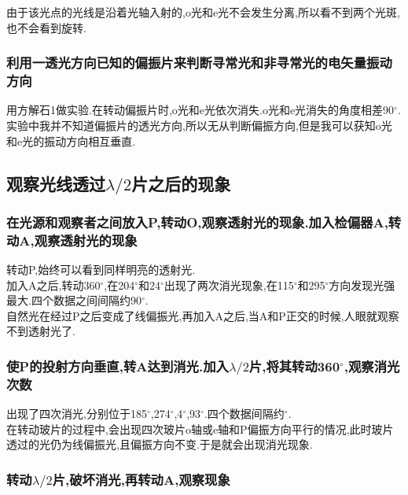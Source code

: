 \documentclass[a4paper,10pt,notitlepage]{article}
\begin{document}
	由于该光点的光线是沿着光轴入射的,o光和e光不会发生分离,所以看不到两个光斑,也不会看到旋转. \\
	
\subsubsection{利用一透光方向已知的偏振片来判断寻常光和非寻常光的电矢量振动方向}

	用方解石1做实验.在转动偏振片时,o光和e光依次消失.o光和e光消失的角度相差90$^{\circ}$. \\
	
	实验中我并不知道偏振片的透光方向,所以无从判断偏振方向,但是我可以获知o光和e光的振动方向相互垂直. \\

\subsection{观察光线透过$\lambda / 2$片之后的现象}

\subsubsection{在光源和观察者之间放入P,转动O,观察透射光的现象.加入检偏器A,转动A,观察透射光的现象}

	转动P,始终可以看到同样明亮的透射光. \\
	
	加入A之后,转动360$^{\circ}$,在204$^{\circ}$和24$^{\circ}$出现了两次消光现象,在115$^{\circ}$和295$^{\circ}$方向发现光强最大.四个数据之间间隔约90$^{\circ}$. \\
	
	自然光在经过P之后变成了线偏振光,再加入A之后,当A和P正交的时候,人眼就观察不到透射光了. \\
	
\subsubsection{使P的投射方向垂直,转A达到消光.加入$\lambda / 2$片,将其转动360$^{\circ}$,观察消光次数}

	出现了四次消光,分别位于185$^{\circ}$,274$^{\circ}$,4$^{\circ}$,93$^{\circ}$.四个数据间隔约$^{\circ}$. \\
	
	在转动玻片的过程中,会出现四次玻片o轴或e轴和P偏振方向平行的情况,此时玻片透过的光仍为线偏振光,且偏振方向不变.于是就会出现消光现象. \\
	
\subsubsection{转动$\lambda / 2$片,破坏消光,再转动A,观察现象}
\end{document}
